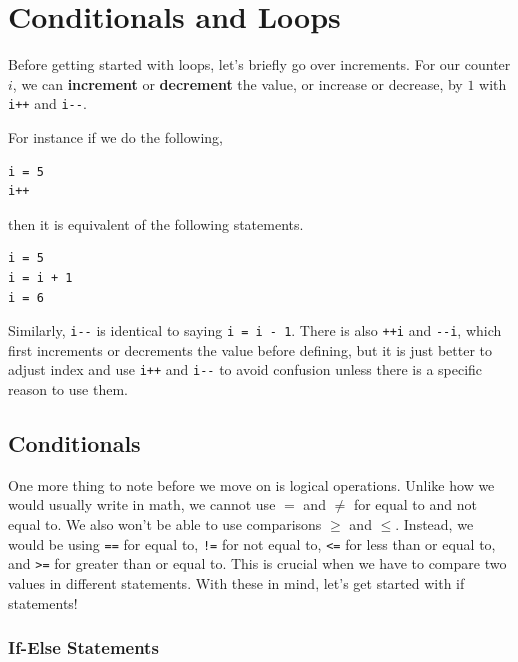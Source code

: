 \documentclass[../../../main.tex]{subfiles}
\begin{document}
\section{Conditionals and Loops}

Before getting started with loops, let's briefly go over increments.
For our counter $i$, we can \textbf{increment} or \textbf{decrement}
the value, or increase or decrease, by $1$ with \verb|i++| and
\verb|i--|.

For instance if we do the following,

\begin{basicbox}
\begin{lstlisting}[style=basic]
i = 5
i++
\end{lstlisting}
\end{basicbox}

then it is equivalent of the following statements.

\begin{basicbox}
\begin{lstlisting}[style=basic]
i = 5
i = i + 1
i = 6
\end{lstlisting}
\end{basicbox}

Similarly, \verb|i--| is identical to saying \verb|i = i - 1|.
There is also \verb|++i| and \verb|--i|, which first increments or
decrements the value before defining, but it is just better to
adjust index and use \verb|i++| and \verb|i--| to avoid confusion
unless there is a specific reason to use them.

\subsection{Conditionals}

One more thing to note before we move on is logical operations.
Unlike how we would usually write in math, we cannot use $=$ and
$\neq$ for equal to and not equal to. We also won't be able to use
comparisons $\geq$ and $\leq$. Instead, we would be using \verb|==|
for equal to, \verb|!=| for not equal to, \verb|<=| for less than or
equal to, and \verb|>=| for greater than or equal to. This is
crucial when we have to compare two values in different statements.
With these in mind, let's get started with if statements!

\subsubsection{If-Else Statements}
\end{document}
